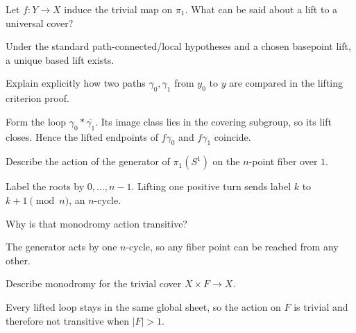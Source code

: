 \begin{problem}\label{prob:viii11-14}
Let \(f:Y\to X\) induce the trivial map on \(\pi_1\). What can be said about a lift to a universal cover?
\end{problem}
\begin{solution}
Under the standard path-connected/local hypotheses and a chosen basepoint lift, a unique based lift exists.
\end{solution}

\begin{problem}\label{prob:viii11-15}
Explain explicitly how two paths \(\gamma_0,\gamma_1\) from \(y_0\) to \(y\) are compared in the lifting criterion proof.
\end{problem}
\begin{solution}
Form the loop \(\gamma_0*\overline{\gamma_1}\). Its image class lies in the covering subgroup, so its lift closes. Hence the lifted endpoints of \(f\gamma_0\) and \(f\gamma_1\) coincide.
\end{solution}

\begin{problem}\label{prob:viii11-16}
Describe the action of the generator of \(\pi_1(S^1)\) on the \(n\)-point fiber over \(1\).
\end{problem}
\begin{solution}
Label the roots by \(0,\dots,n-1\). Lifting one positive turn sends label \(k\) to \(k+1\pmod n\), an \(n\)-cycle.
\end{solution}

\begin{problem}[Transitivity]\label{prob:viii11-17}
Why is that monodromy action transitive?
\end{problem}
\begin{solution}
The generator acts by one \(n\)-cycle, so any fiber point can be reached from any other.
\end{solution}

\begin{problem}\label{prob:viii11-18}
Describe monodromy for the trivial cover \(X\times F\to X\).
\end{problem}
\begin{solution}
Every lifted loop stays in the same global sheet, so the action on \(F\) is trivial and therefore not transitive when \(|F|>1\).
\end{solution}

